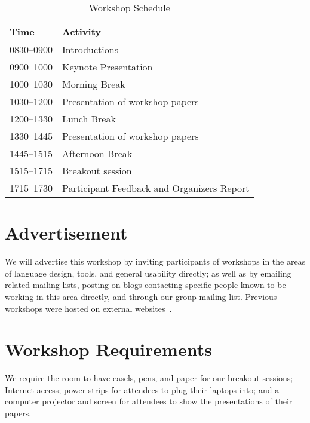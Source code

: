 \documentclass{sigplanconf}
\begin{document}
\begin{table} [!htbp] %
\begin{tabularx}{\columnwidth}{|l|X|}
\hline
\textbf{Time}   & \textbf{Activity} \\
\hline
0830--0900    & Introductions \vspace{1mm} \\
0900--1000    & Keynote Presentation \vspace{1mm} \\
1000--1030    & Morning Break~\vspace{1mm}\\
1030--1200    & Presentation of workshop papers \vspace{1mm}\\
1200--1330    & Lunch Break~\vspace{1mm}\\
1330--1445   & Presentation of workshop papers \vspace{1mm}\\
1445--1515    & Afternoon Break~\vspace{1mm}\\
1515--1715    & Breakout session \vspace{1mm}\\
1715--1730    & Participant Feedback and Organizers Report  \\
\end{tabularx}
\caption{Workshop Schedule}
\label{tab:schedule}
\end{table}


\section{Advertisement}

We will advertise this workshop by inviting participants of workshops
in the areas of language design, tools, and general usability
directly; as well as by emailing related mailing lists, posting on
blogs contacting specific people known to be working in this area directly,
and through our group mailing list. Previous workshops were hosted on external websites~\cite{website-sites,website-vuw}.

\section{Workshop Requirements}

We require the room to have easels, pens, and paper for our breakout sessions; 
Internet access; power strips for attendees to plug their laptops into; and a computer projector and
screen for attendees to show the presentations of their
papers.
\end{document}
